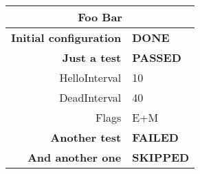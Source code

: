
\begin{tabular}{|r|l|} 
	\hline 
	\multicolumn{2}{|c|}{Foo Bar} \\ 
	\hline 
	\hline 
	\textbf{Initial configuration} & \textbf{DONE} \\
	\hline 
	\textbf{Just a test} & \textbf{PASSED} \\
	\hline 
	HelloInterval & 10 \\
	DeadInterval & 40 \\
	Flags & E+M \\
	\hline 
	\textbf{Another test} & \textbf{FAILED} \\
	\hline 
	\textbf{And another one} & \textbf{SKIPPED} \\
	\hline 
\end{tabular}

